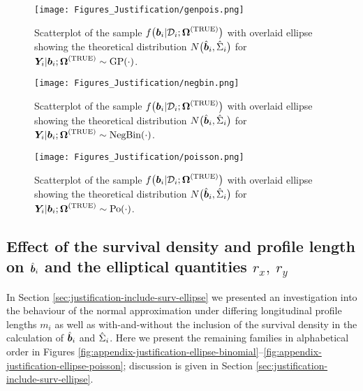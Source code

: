 \clearpage
\thispagestyle{empty}
\begin{landscape}
\begin{figure}
    \centering
    \texttt{[image: Figures\_Justification/genpois.png]}
    \caption{Scatterplot of the sample $f\big(\bm{b}_i|\mathcal{D}_i;\bm{\mathrm{\Omega}}^{(\mathrm{TRUE})}\big)$ with overlaid ellipse showing the theoretical distribution $N\big(\hat{\bm{b}}_i,\hat{\Sigma}_i\big)$ for $\bm{Y}_i|\bm{b}_i;\bm{\mathrm{\Omega}}^{(\mathrm{TRUE})}\sim\mathrm{GP}\!\left(\cdot\right)$.}
    \label{fig:appendix-justification-genpois}
\end{figure}
\vfill
\lscapepageno
\end{landscape}
\clearpage
\thispagestyle{empty}
\begin{landscape}
\begin{figure}
    \centering
    \texttt{[image: Figures\_Justification/negbin.png]}
    \caption{Scatterplot of the sample $f\big(\bm{b}_i|\mathcal{D}_i;\bm{\mathrm{\Omega}}^{(\mathrm{TRUE})}\big)$ with overlaid ellipse showing the theoretical distribution $N\big(\hat{\bm{b}}_i,\hat{\Sigma}_i\big)$ for $\bm{Y}_i|\bm{b}_i;\bm{\mathrm{\Omega}}^{(\mathrm{TRUE})}\sim\mathrm{NegBin}\!\left(\cdot\right)$.}
    \label{fig:appendix-justification-negbin}
\end{figure}
\vfill
\lscapepageno
\end{landscape}
\clearpage
\thispagestyle{empty}
\begin{landscape}
\begin{figure}
    \centering
    \texttt{[image: Figures\_Justification/poisson.png]}
    \caption{Scatterplot of the sample $f\big(\bm{b}_i|\mathcal{D}_i;\bm{\mathrm{\Omega}}^{(\mathrm{TRUE})}\big)$ with overlaid ellipse showing the theoretical distribution $N\big(\hat{\bm{b}}_i,\hat{\Sigma}_i\big)$ for $\bm{Y}_i|\bm{b}_i;\bm{\mathrm{\Omega}}^{(\mathrm{TRUE})}\sim\mathrm{Po}\!\left(\cdot\right)$.}
    \label{fig:appendix-justification-poisson}
\end{figure}
\vfill
\lscapepageno
\end{landscape}
\clearpage
\restoregeometry

\subsection{Effect of the survival density and profile length on \texorpdfstring{$\hat{\bm{b}}_i$}{hb} and the elliptical quantities \texorpdfstring{$r_x,\ r_y$}{rxry}}\label{sec:appendix-suppfigs-justification-ellipses}
In Section \ref{sec:justification-include-surv-ellipse} we presented an investigation into the behaviour of the normal approximation under differing longitudinal profile lengths $m_i$ as well as with-and-without the inclusion of the survival density in the calculation of $\hat{\bm{b}}_i$ and $\hat{\Sigma}_i$. Here we present the remaining families in alphabetical order in Figures \ref{fig:appendix-justification-ellipse-binomial}--\ref{fig:appendix-justification-ellipse-poisson}; discussion is given in Section \ref{sec:justification-include-surv-ellipse}.

